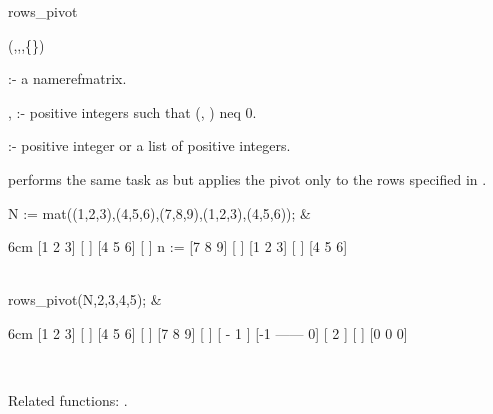\begin{Operator}{rows_pivot}

\begin{Syntax}
(,,,\{\})
\end{Syntax}

     :- a nameref{matrix}.

, :- positive integers such that (,
                     ) neq 0.

  :- positive integer or a list of positive integers.

 performs the same task as   but applies 
the pivot only to the rows specified in .


\begin{Examples}

N := mat((1,2,3),(4,5,6),(7,8,9),(1,2,3),(4,5,6)); &
\begin{multilineoutput}{6cm}
     [1  2  3]
     [       ]
     [4  5  6]
     [       ]
n := [7  8  9]
     [       ]
     [1  2  3]
     [       ]
     [4  5  6]
\end{multilineoutput}\\

rows_pivot(N,2,3,{4,5}); &
\begin{multilineoutput}{6cm}
[1     2     3]
[             ]
[4     5     6]
[             ]
[7     8     9]
[             ]
[      - 1    ]
[-1  ------  0]
[      2      ]
[             ]
[0     0     0]
\end{multilineoutput}\\

\end{Examples}

Related functions: .

\end{Operator}


